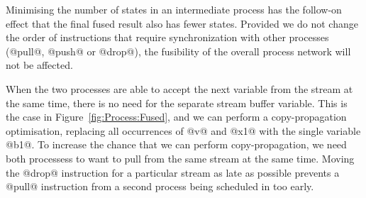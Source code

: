 Minimising the number of states in an intermediate process has the follow-on effect that the final fused result also has fewer states. Provided we do not change the order of instructions that require synchronization with other processes (@pull@, @push@ or @drop@), the fusibility of the overall process network will not be affected.


When the two processes are able to accept the next variable from the stream at the same time, there is no need for the separate stream buffer variable. This is the case in Figure~\ref{fig:Process:Fused}, and we can perform a copy-propagation optimisation, replacing all occurrences of @v@ and @x1@ with the single variable @b1@. To increase the chance that we can perform copy-propagation, we need both processess to want to pull from the same stream at the same time. Moving the @drop@ instruction for a particular stream as late as possible prevents a @pull@ instruction from a second process being scheduled in too early.



